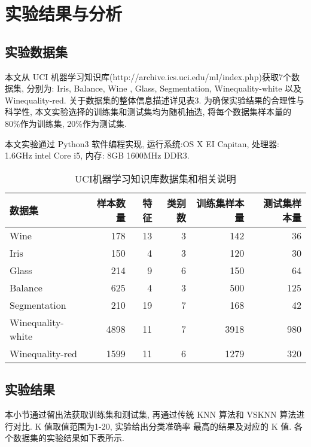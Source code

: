 \documentclass[11pt]{article}
\numberwithin{equation}{section}
\begin{document}
\section{实验结果与分析}
\subsection{实验数据集}
本文从 UCI 机器学习知识库(http://archive.ics.uci.edu/ml/index.php)获取7个数据集, 分别为:  Iris, Balance, Wine , Glass,  Segmentation,  Winequality-white 以及 Winequality-red. 关于数据集的整体信息描述详见表3. 为确保实验结果的合理性与科学性, 本文实验选择的训练集和测试集均为随机抽选, 将每个数据集样本量的 80\%作为训练集, 20\%作为测试集.


本文实验通过 Python3 软件编程实现, 运行系统:OS X EI Capitan, 处理器: 1.6GHz intel Core i5, 内存: 8GB 1600MHz DDR3.

\begin{table}[H]
  \centering 
    \caption{UCI机器学习知识库数据集和相关说明}\label{表1说明}
  \begin{tabular}{lrrrrr}
\hline
数据集 & 样本数量 & 特征 & 类别数 & 训练集样本量 & 测试集样本量\\
 \hline
Wine & 178 & 13 & 3 & 142 & 36 \\
Iris & 150 & 4 & 3 & 120 & 30 \\
Glass & 214 & 9 & 6 & 150 & 64\\
Balance & 625 & 4 & 3 & 500 & 125\\
Segmentation & 210 & 19 & 7 & 168 & 42 \\
Winequality-white & 4898 & 11 & 7 & 3918 & 980 \\
Winequality-red & 1599 & 11 & 6 & 1279 & 320 \\
\hline
\end{tabular}
\end{table}

\subsection{实验结果}
本小节通过留出法获取训练集和测试集, 再通过传统 KNN 算法和 VSKNN 算法进行对比. K 值取值范围为1-20, 实验给出分类准确率
最高的结果及对应的 K 值. 各个数据集的实验结果如下表所示.
\end{document}
